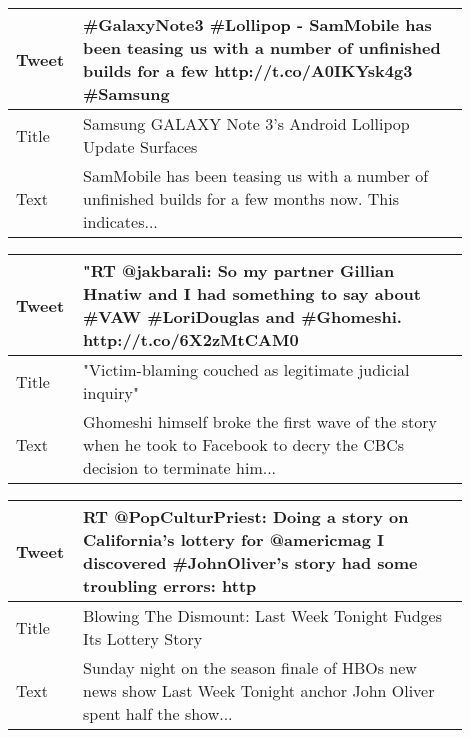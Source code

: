 \begin{table}[!htbp]
\centering
\begin{tabular}{|p{0.1\linewidth}|p{0.8\linewidth}|}
\hline
Tweet & \#GalaxyNote3 \#Lollipop - SamMobile has been teasing us with a number of unfinished builds for a few http://t.co/A0IKYsk4g3 \#Samsung \\ \hline
Title &   Samsung GALAXY Note 3's Android Lollipop Update Surfaces                                                                                 \\ \hline
Text  &  SamMobile has been teasing us with a number of unfinished builds for a few months now. This indicates...                                                                                         \\ \hline
\end{tabular}
\label{tab:exq1yes}
\end{table}


\begin{table}[!htbp]
\centering
\begin{tabular}{|p{0.1\linewidth}|p{0.8\linewidth}|}
\hline
Tweet & "RT @jakbarali: So my partner Gillian Hnatiw and I had something to say about \#VAW \#LoriDouglas and \#Ghomeshi. http://t.co/6X2zMtCAM0 \\ \hline
Title & "Victim-blaming couched as legitimate judicial inquiry" \\ \hline
Text  & Ghomeshi himself broke the first wave of the story when he took to Facebook to decry the CBCs decision to terminate him... \\ \hline
\end{tabular}
\label{tab:exq2no}
\end{table}

\begin{table}[!htbp]
\centering
\begin{tabular}{|p{0.1\linewidth}|p{0.8\linewidth}|}
\hline
Tweet & RT @PopCulturPriest: Doing a story on California's lottery for @americmag I discovered \#JohnOliver's story had some troubling errors: http \\ \hline
Title & Blowing The Dismount: Last Week Tonight Fudges Its Lottery Story \\ \hline
Text  & Sunday night on the season finale of HBOs new news show Last Week Tonight anchor John Oliver spent half the show... \\ \hline
\end{tabular}
\label{tab:exq2yes}
\end{table}

